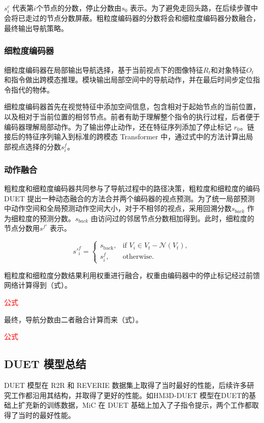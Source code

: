 \documentclass[bachelor]{thesis-uestc}
\begin{document}
$s^c_i $ 代表第$i$个节点的分数，停止分数由$s_0$ 表示。为了避免走回头路，在后续步骤中会将已走过的节点分数屏蔽。粗粒度编码器的分数将会和细粒度编码器分数融合，最终输出导航策略。

\subsubsection{细粒度编码器}

细粒度编码器在局部输出导航选择，基于当前视点下的图像特征$R_t$和对象特征$O_t$ 和指令做出跨模态推理。模块输出局部空间中的导航动作，并在最后时间步定位指令指代的物体。

细粒度编码器首先在视觉特征中添加空间信息，包含相对于起始节点的当前位置，以及相对于当前位置的相邻节点。前者有助于理解整个指令的执行过程，后者便于编码器理解局部动作。为了输出停止动作，还在特征序列添加了停止标记 $r_0$。链接后的特征序列输入到标准的跨模态 Transformer 中，通过式中的方法计算出局部视点选择的分数$s^f_i$。

\subsubsection{动作融合}

粗粒度和细粒度编码器共同参与了导航过程中的路径决策，粗粒度和细粒度的编码DUET 提出一种动态融合的方法合并两个编码器的视点预测。为了统一局部预测中动作空间和全局预测动作空间大小，对于不相邻的视点，采用回溯分数$s_{back}$ 作为细粒度的预测分数。$s_{back}$ 由访问过的邻居节点分数相加得到。此时，细粒度的节点分数用$s^{f'}$ 表示。

\begin{equation}
    s'^{f}_{i} = 
\begin{cases} 
s_{\text{back}}, & \text{if } V_{i} \in V_{t} - \mathcal{N}(V_{t}), \\
s^{f}_{i}, & \text{otherwise}.
\end{cases}
\label{fusion}
\end{equation}

粗粒度和细粒度分数结果利用权重进行融合，权重由编码器中的停止标记经过前馈网络计算得到（式）。

\textcolor{red}{公式}

最终，导航分数由二者融合计算而来（式）。

\textcolor{red}{公式}

\subsection{DUET 模型总结}
DUET 模型在 R2R 和 REVERIE 数据集上取得了当时最好的性能，后续许多研究工作都沿用其结构，并取得了更好的性能。如HM3D-DUET 模型在DUET的基础上扩充新的训练数据，MiC 在 DUET 基础上加入了子指令提示，两个工作都取得了当时的最好性能。
\end{document}
